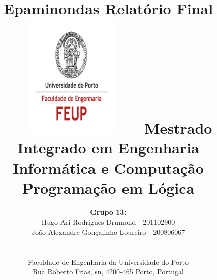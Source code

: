 \documentclass[a4paper]{article}
\begin{document}
\setlength{\textwidth}{16cm}
\setlength{\textheight}{22cm}

\title{\Huge\textbf{Epaminondas}\linebreak\linebreak\linebreak
\Large\textbf{Relatório Final}\linebreak\linebreak
\includegraphics[height=6cm, width=7cm]{feup.pdf}\linebreak \linebreak
\Large{Mestrado Integrado em Engenharia Informática e Computação} \linebreak \linebreak
\Large{Programação em Lógica}\linebreak
}

\author{\textbf{Grupo 13:}\\ Hugo Ari Rodrigues Drumond - 201102900 \\ João Alexandre Gonçalinho Loureiro - 200806067 \\\linebreak\linebreak \\
 \\ Faculdade de Engenharia da Universidade do Porto \\ Rua Roberto Frias, s\/n, 4200-465 Porto, Portugal \linebreak\linebreak\linebreak
\linebreak\linebreak\vspace{1cm}}
\maketitle
\thispagestyle{empty}

\end{document}
